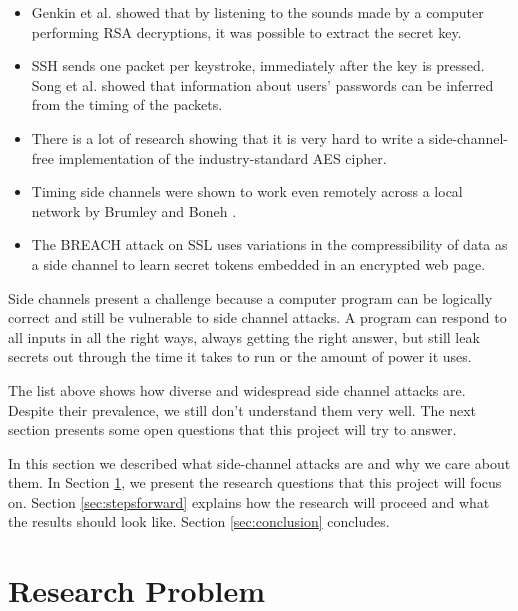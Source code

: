 \documentclass{acm_proc_article-sp}
\begin{document}
\begin{itemize}
\item Genkin et al. \cite{genkin2013rsa} showed that by listening to the sounds
made by a computer performing RSA decryptions, it was possible to extract the
secret key.

\item SSH sends one packet per keystroke, immediately after the key is pressed.
Song et al. \cite{song2001timing} showed that information about users' passwords
can be inferred from the timing of the packets.

\item There is a lot of research \cite{aciiccmez2006cache, bernstein2005cache,
    osvik2006cache, weiss2012cache} showing that it is very hard to write
    a side-channel-free implementation of the industry-standard AES cipher.

\item Timing side channels were shown to work even remotely across a local
network by Brumley and Boneh \cite{brumley2005remote}.

\item The BREACH attack on SSL \cite{gluck2013breach} uses variations in the
    compressibility of data as a side channel to learn secret tokens embedded in
    an encrypted web page.
\end{itemize}

Side channels present a challenge because a computer program can be logically
correct and still be vulnerable to side channel attacks. A program can respond
to all inputs in all the right ways, always getting the right answer, but still
leak secrets out through the time it takes to run or the amount of power it
uses.

The list above shows how diverse and widespread side channel attacks are.
Despite their prevalence, we still don't understand them very well. The next
section presents some open questions that this project will try to answer.

In this section we described what side-channel attacks are and why we care about
them. In Section \ref{sec:problem}, we present the research questions that this
project will focus on. Section \ref{sec:stepsforward} explains how the research
will proceed and what the results should look like. Section \ref{sec:conclusion}
concludes.

\section{Research Problem}
\label{sec:problem}
\end{document}

